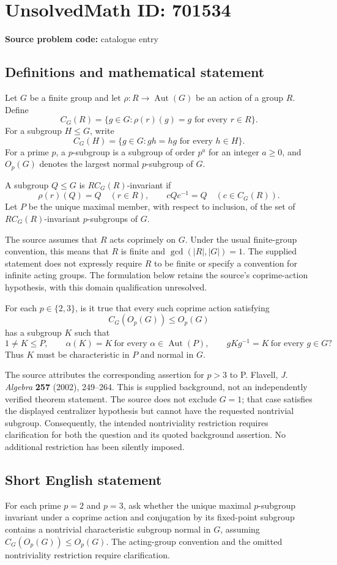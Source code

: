 \documentclass[11pt]{article}
\begin{document}
\section*{UnsolvedMath ID: 701534}
\textbf{Source problem code:} catalogue entry
\subsection{Definitions and mathematical statement}
Let \(G\) be a finite group and let \(\rho\colon R\to\operatorname{Aut}(G)\) be an action of a group \(R\). Define
\[
C_G(R)=\{g\in G:\rho(r)(g)=g\text{ for every }r\in R\}.
\]
For a subgroup \(H\leq G\), write
\[
C_G(H)=\{g\in G:gh=hg\text{ for every }h\in H\}.
\]
For a prime \(p\), a \(p\)-subgroup is a subgroup of order \(p^a\) for an integer \(a\geq0\), and \(O_p(G)\) denotes the largest normal \(p\)-subgroup of \(G\).

A subgroup \(Q\leq G\) is \(RC_G(R)\)-invariant if
\[
\rho(r)(Q)=Q\quad(r\in R),\qquad cQc^{-1}=Q\quad(c\in C_G(R)).
\]
Let \(P\) be the unique maximal member, with respect to inclusion, of the set of \(RC_G(R)\)-invariant \(p\)-subgroups of \(G\).

The source assumes that \(R\) acts coprimely on \(G\). Under the usual finite-group convention, this means that \(R\) is finite and \(\gcd(|R|,|G|)=1\). The supplied statement does not expressly require \(R\) to be finite or specify a convention for infinite acting groups. The formulation below retains the source's coprime-action hypothesis, with this domain qualification unresolved.

For each \(p\in\{2,3\}\), is it true that every such coprime action satisfying
\[
C_G(O_p(G))\leq O_p(G)
\]
has a subgroup \(K\) such that
\[
1\neq K\leq P,\qquad
\alpha(K)=K\ \text{for every }\alpha\in\operatorname{Aut}(P),\qquad
 gKg^{-1}=K\ \text{for every }g\in G?
\]
Thus \(K\) must be characteristic in \(P\) and normal in \(G\).

The source attributes the corresponding assertion for \(p>3\) to P. Flavell, \emph{J. Algebra} \textbf{257} (2002), 249--264. This is supplied background, not an independently verified theorem statement. The source does not exclude \(G=1\); that case satisfies the displayed centralizer hypothesis but cannot have the requested nontrivial subgroup. Consequently, the intended nontriviality restriction requires clarification for both the question and its quoted background assertion. No additional restriction has been silently imposed.
\subsection{Short English statement}
For each prime \(p=2\) and \(p=3\), ask whether the unique maximal \(p\)-subgroup invariant under a coprime action and conjugation by its fixed-point subgroup contains a nontrivial characteristic subgroup normal in \(G\), assuming \(C_G(O_p(G))\leq O_p(G)\). The acting-group convention and the omitted nontriviality restriction require clarification.
\end{document}
